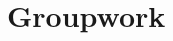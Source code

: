 \documentclass[12pt]{exam}
\newcounter{probnumcount}
\begin{document}
\begin{solution}
    ~\\~\\~\\~\\~\\~\\~\\~\\~\\~\\
    ~\\~\\~\\~\\~\\~\\~\\~\\~\\~\\
    ~\\~\\~\\~\\~\\~\\~\\~\\~\\~\\
    ~\\~\\~\\~\\~\\~\\~\\~\\~\\~\\

\end{solution}


\pagebreak
\setcounter{probnumcount}{1}
\section*{Groupwork}
\end{document}
